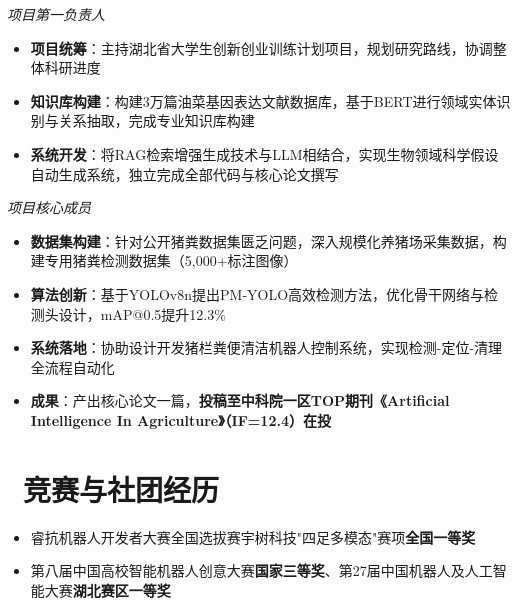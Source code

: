 \documentclass[8pt]{resume}
\begin{document}
\textit{项目第一负责人}

\begin{onehalfspacing}
\begin{itemize}[itemsep=-1pt, parsep=2pt]
  \item \textbf{项目统筹}：主持湖北省大学生创新创业训练计划项目，规划研究路线，协调整体科研进度
  \item \textbf{知识库构建}：构建3万篇油菜基因表达文献数据库，基于BERT进行领域实体识别与关系抽取，完成专业知识库构建
  \item \textbf{系统开发}：将RAG检索增强生成技术与LLM相结合，实现生物领域科学假设自动生成系统，独立完成全部代码与核心论文撰写
\end{itemize}
\end{onehalfspacing}

\textit{项目核心成员}

\begin{onehalfspacing}
\begin{itemize}[itemsep=-1pt, parsep=2pt]
  \item \textbf{数据集构建}：针对公开猪粪数据集匮乏问题，深入规模化养猪场采集数据，构建专用猪粪检测数据集（5,000+标注图像）
  \item \textbf{算法创新}：基于YOLOv8n提出PM-YOLO高效检测方法，优化骨干网络与检测头设计，mAP@0.5提升12.3\%
  \item \textbf{系统落地}：协助设计开发猪栏粪便清洁机器人控制系统，实现检测-定位-清理全流程自动化
  \item \textbf{成果}：产出核心论文一篇，\textbf{投稿至中科院一区TOP期刊《Artificial Intelligence In Agriculture》（IF=12.4）在投}
\end{itemize}
\end{onehalfspacing}

\section{\faTrophy\ 竞赛与社团经历}

\begin{itemize}[itemsep=-1pt, parsep=1pt]
  \item 睿抗机器人开发者大赛全国选拔赛宇树科技"四足多模态"赛项\textbf{全国一等奖}
  \item 第八届中国高校智能机器人创意大赛\textbf{国家三等奖}、第27届中国机器人及人工智能大赛\textbf{湖北赛区一等奖}
\end{itemize}
\end{document}
